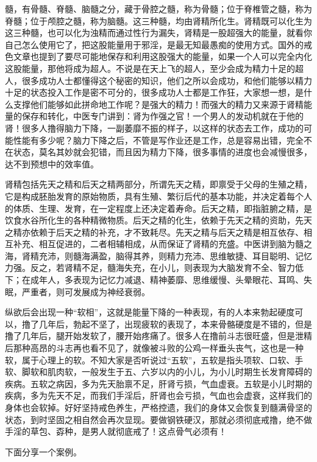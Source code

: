 髓，有骨髓、脊髓、脑髓之分，藏于骨腔之髓，称为骨髓；位于脊椎管之髓，称为脊髓；位于颅腔之髓，称为脑髓。这三种髓，均由肾精所化生。肾精既可以化生为这三种髓，也可以化为浊精而通过性行为漏失，肾精是一股超强大的能量，就看你自己怎么使用它了，把这股能量用于邪淫，是最无知最愚痴的使用方式。国外的戒色文章也提到了要尽可能地保存和利用这股强大的能量，如果一个人可以完全内化这股能量，那他将成为超人。不说是在天上飞的超人，至少会成为精力十足的超人，很多成功人士都懂得这个秘密的知识，他们之所以会成功，和他们能够以精力十足的状态投入工作是密不可分的，很多成功人士都是工作狂，大家想一想，是什么支撑他们能够如此拼命地工作呢？是强大的精力！而强大的精力又来源于肾精能量的保存和转化，中医专门讲到：肾为作强之官！一个男人的发动机就在于他的肾！很多人撸得脑力下降，一副萎靡不振的样子，以这样的状态去工作，成功的可能性能有多少呢？脑力下降之后，不管是写作业还是工作，总是容易出错，完全不在状态，莫名其妙就会犯错，而且因为精力下降，很多事情的进度也会减慢很多，达不到预想中的效率值。

肾精包括先天之精和后天之精两部分，所谓先天之精，即禀受于父母的生殖之精，它是构成胚胎发育的原始物质，具有生殖、繁衍后代的基本功能，并决定着每个人的体质、生理、发育，在一定程度上还决定着寿命。后天之精，即指脏腑之精，是饮食水谷所化生的各种精微物质。后天之精的化生，依赖于先天之精的资助，先天之精亦依赖于后天之精的补充，才不致耗尽。先天之精与后天之精是相互依存、相互补充、相互促进的，二者相辅相成，从而保证了肾精的充盛。中医讲到脑为髓之海，肾精充沛，则髓海满盈，脑得其养，则精力充沛、思维敏捷、耳目聪明、记忆力强。反之，若肾精不足，髓海失充，在小儿，则表现为大脑发育不全、智力低下；在成年人，多表现为记忆力减退、精神萎靡、思维缓慢、头晕眼花、耳鸣、失眠，严重者，则可发展成为神经衰弱。

纵欲后会出现一种“软相”，这就是能量下降的一种表现，有的人本来勃起硬度可以，撸了几年后，勃起不坚了，出现疲软的表现了，本来骨骼硬度是不错的，但是撸了几年后，腿开始发软了，腰开始疼痛了。很多人在撸前斗志很旺盛，但是泄精后那种高昂的斗志再也看不见了，就像被斗败的公鸡一样垂头丧气，这也是一种软，属于心理上的软。不知大家是否听说过“五软”，五软是指头项软、口软、手软、脚软和肌肉软，一般发生于五、六岁以内的小儿，为小儿时期生长发育障碍的疾病。五软之病因，多为先天胎禀不足，肝肾亏损，气血虚衰。五软是小儿时期的疾病，多为先天不足，而我们手淫后，肝肾也会亏损，气血也会虚衰，这样我们的身体也会软掉。好好坚持戒色养生，严格控遗，我们的身体又会恢复到髓满骨坚的状态，到时坚固之相自然会再次显现。要做钢铁硬汉，那就必须彻底戒撸，绝不做手淫的草包、孬种，是男人就彻底戒了！这点骨气必须有！

下面分享一个案例。


